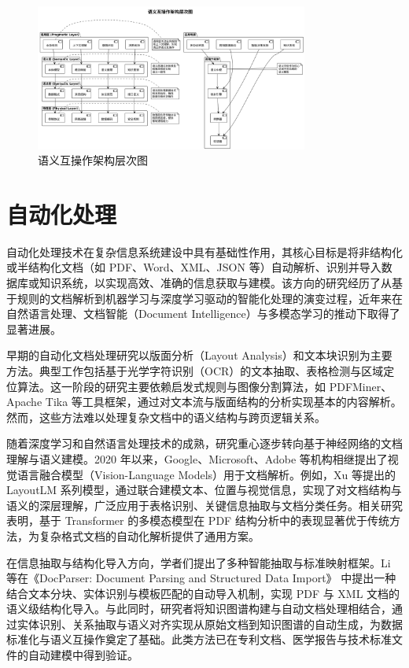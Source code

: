 \begin{figure}[H]
    \centering
    \includegraphics[width=0.8\textwidth,height=0.6\textheight,keepaspectratio]{chapters/fig-0/semantic_interop_architecture.png}
    \caption{语义互操作架构层次图}
    \label{fig_semantic_interop_architecture}
\end{figure}


\section{自动化处理}

自动化处理技术在复杂信息系统建设中具有基础性作用，其核心目标是将非结构化或半结构化文档（如 PDF、Word、XML、JSON 等）自动解析、识别并导入数据库或知识系统，以实现高效、准确的信息获取与建模。该方向的研究经历了从基于规则的文档解析到机器学习与深度学习驱动的智能化处理的演变过程，近年来在自然语言处理、文档智能（Document Intelligence）与多模态学习的推动下取得了显著进展。

早期的自动化文档处理研究以版面分析（Layout Analysis）和文本块识别为主要方法。典型工作包括基于光学字符识别（OCR）的文本抽取、表格检测与区域定位算法。这一阶段的研究主要依赖启发式规则与图像分割算法，如 PDFMiner、Apache Tika 等工具框架，通过对文本流与版面结构的分析实现基本的内容解析。然而，这些方法难以处理复杂文档中的语义结构与跨页逻辑关系。

随着深度学习和自然语言处理技术的成熟，研究重心逐步转向基于神经网络的文档理解与语义建模。2020 年以来，Google、Microsoft、Adobe 等机构相继提出了视觉语言融合模型（Vision-Language Models）用于文档解析。例如，Xu 等提出的 LayoutLM 系列模型\cite{Xu2020LayoutLM,Xu2022LayoutLMv3}，通过联合建模文本、位置与视觉信息，实现了对文档结构与语义的深层理解，广泛应用于表格识别、关键信息抽取与文档分类任务。相关研究表明，基于 Transformer 的多模态模型在 PDF 结构分析中的表现显著优于传统方法，为复杂格式文档的自动化解析提供了通用方案。

在信息抽取与结构化导入方向，学者们提出了多种智能抽取与标准映射框架。Li 等在《DocParser: Document Parsing and Structured Data Import》\cite{Li2021DocParser} 中提出一种结合文本分块、实体识别与模板匹配的自动导入机制，实现 PDF 与 XML 文档的语义级结构化导入。与此同时，研究者将知识图谱构建与自动文档处理相结合，通过实体识别、关系抽取与语义对齐实现从原始文档到知识图谱的自动生成，为数据标准化与语义互操作奠定了基础。此类方法已在专利文档、医学报告与技术标准文件的自动建模中得到验证。

